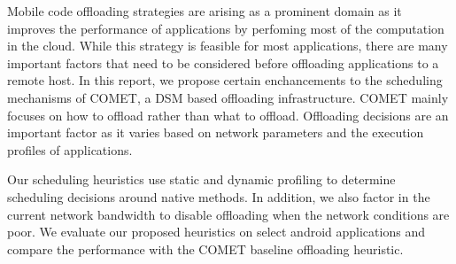 \vspace{2mm}
Mobile code offloading strategies are arising as a prominent domain as it improves the performance of
applications by perfoming most of the computation in the cloud. While this strategy is feasible for most
applications, there are many important factors that need to be considered before offloading applications
to a remote host. In this report, we propose certain enchancements to the scheduling mechanisms of COMET,
a DSM based offloading infrastructure. COMET mainly focuses on how to offload rather than what to offload.
Offloading decisions are an important factor as it varies based on network parameters and the execution
profiles of applications.

Our scheduling heuristics use static and dynamic profiling to determine scheduling decisions around native
methods. In addition, we also factor in the current network bandwidth to disable offloading when the network
conditions are poor. We evaluate our proposed heuristics on select android applications and compare the
performance with the COMET baseline offloading heuristic.
